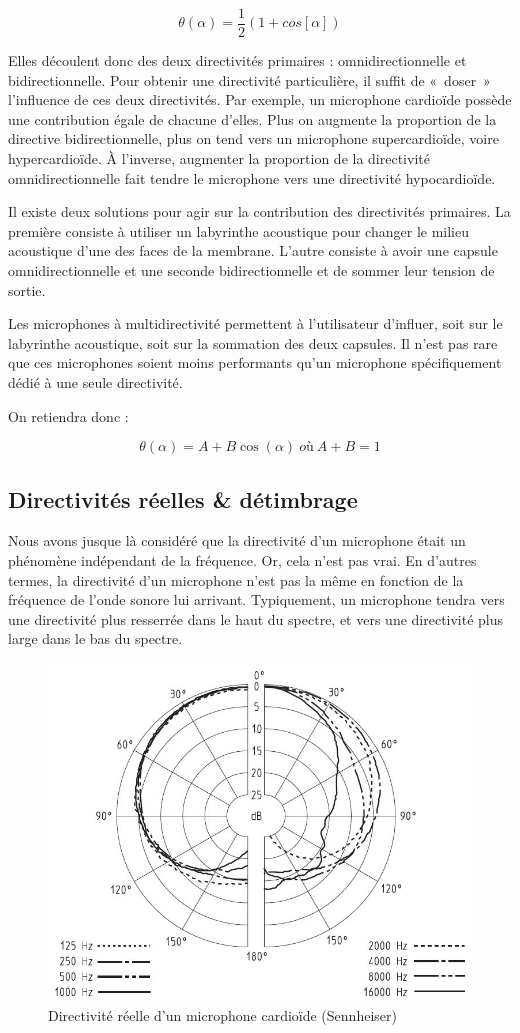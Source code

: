 \documentclass[
]{book}
\begin{document}
\[ \theta(\alpha) = \frac{1}{2}(1 + cos[\alpha]) \]

Elles découlent donc des deux directivités primaires : omnidirectionnelle et bidirectionnelle. Pour obtenir une directivité particulière, il suffit de «~doser~» l'influence de ces deux directivités. Par exemple, un microphone cardioïde possède une contribution égale de chacune d'elles. Plus on augmente la proportion de la directive bidirectionnelle, plus on tend vers un microphone supercardioïde, voire hypercardioïde. À l'inverse, augmenter la proportion de la directivité omnidirectionnelle fait tendre le microphone vers une directivité hypocardioïde.

Il existe deux solutions pour agir sur la contribution des directivités primaires. La première consiste à utiliser un labyrinthe acoustique pour changer le milieu acoustique d'une des faces de la membrane. L'autre consiste à avoir une capsule omnidirectionnelle et une seconde bidirectionnelle et de sommer leur tension de sortie.

Les microphones à multidirectivité permettent à l'utilisateur d'influer, soit sur le labyrinthe acoustique, soit sur la sommation des deux capsules. Il n'est pas rare que ces microphones soient moins performants qu'un microphone spécifiquement dédié à une seule directivité.

On retiendra donc :

\[ \theta(\alpha) = A + B \cos (\alpha) \> où \> A + B = 1\]

\hypertarget{directivituxe9s-ruxe9elles-duxe9timbrage}{%
\subsection{Directivités réelles \& détimbrage}\label{directivituxe9s-ruxe9elles-duxe9timbrage}}

Nous avons jusque là considéré que la directivité d'un microphone était un phénomène indépendant de la fréquence. Or, cela n'est pas vrai. En d'autres termes, la directivité d'un microphone n'est pas la même en fonction de la fréquence de l'onde sonore lui arrivant. Typiquement, un microphone tendra vers une directivité plus resserrée dans le haut du spectre, et vers une directivité plus large dans le bas du spectre.

\begin{figure}

{\centering \includegraphics[width=0.5\linewidth]{_resources/image_15} 

}

\caption{Directivité réelle d'un microphone cardioïde (Sennheiser)}\label{fig:unnamed-chunk-17}
\end{figure}
\end{document}

